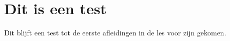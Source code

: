 \documentclass[]{subfiles}
\begin{document}
\section{Dit is een test}
Dit blijft een test tot de eerste afleidingen in de les voor zijn gekomen.
\end{document}
